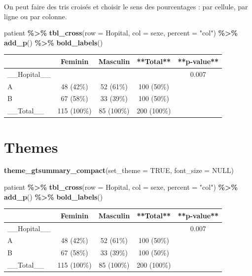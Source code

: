 \documentclass[
]{book}
\newenvironment{Shaded}{\begin{snugshade}}{\end{snugshade}}
\newcommand{\AttributeTok}[1]{\textcolor[rgb]{0.13,0.29,0.53}{#1}}
\newcommand{\ConstantTok}[1]{\textcolor[rgb]{0.56,0.35,0.01}{#1}}
\newcommand{\FunctionTok}[1]{\textcolor[rgb]{0.13,0.29,0.53}{\textbf{#1}}}
\newcommand{\NormalTok}[1]{#1}
\newcommand{\SpecialCharTok}[1]{\textcolor[rgb]{0.81,0.36,0.00}{\textbf{#1}}}
\newcommand{\StringTok}[1]{\textcolor[rgb]{0.31,0.60,0.02}{#1}}
\begin{document}
On peut faire des tris croisés et choisir le sens des pourcentages : par cellule,
par ligne ou par colonne.

\begin{Shaded}
\begin{Highlighting}[]
\NormalTok{patient }\SpecialCharTok{\%\textgreater{}\%}
  \FunctionTok{tbl\_cross}\NormalTok{(}\AttributeTok{row =}\NormalTok{ Hopital, }\AttributeTok{col =}\NormalTok{ sexe, }\AttributeTok{percent =} \StringTok{"col"}\NormalTok{) }\SpecialCharTok{\%\textgreater{}\%}
  \FunctionTok{add\_p}\NormalTok{() }\SpecialCharTok{\%\textgreater{}\%}
  \FunctionTok{bold\_labels}\NormalTok{()}
\end{Highlighting}
\end{Shaded}

\begin{tabular}{l|c|c|c|c}
\hline
 & Feminin & Masculin & **Total** & **p-value**\\
\hline
\_\_Hopital\_\_ &  &  &  & 0.007\\
\hline
A & 48 (42\%) & 52 (61\%) & 100 (50\%) & \\
\hline
B & 67 (58\%) & 33 (39\%) & 100 (50\%) & \\
\hline
\_\_Total\_\_ & 115 (100\%) & 85 (100\%) & 200 (100\%) & \\
\hline
\end{tabular}

\hypertarget{themes}{%
\section{Themes}\label{themes}}

\begin{Shaded}
\begin{Highlighting}[]
\FunctionTok{theme\_gtsummary\_compact}\NormalTok{(}\AttributeTok{set\_theme =} \ConstantTok{TRUE}\NormalTok{, }\AttributeTok{font\_size =} \ConstantTok{NULL}\NormalTok{)}

\NormalTok{patient }\SpecialCharTok{\%\textgreater{}\%}
  \FunctionTok{tbl\_cross}\NormalTok{(}\AttributeTok{row =}\NormalTok{ Hopital, }\AttributeTok{col =}\NormalTok{ sexe, }\AttributeTok{percent =} \StringTok{"col"}\NormalTok{) }\SpecialCharTok{\%\textgreater{}\%}
  \FunctionTok{add\_p}\NormalTok{() }\SpecialCharTok{\%\textgreater{}\%}
  \FunctionTok{bold\_labels}\NormalTok{()}
\end{Highlighting}
\end{Shaded}

\begin{tabular}{l|c|c|c|c}
\hline
 & Feminin & Masculin & **Total** & **p-value**\\
\hline
\_\_Hopital\_\_ &  &  &  & 0.007\\
\hline
A & 48 (42\%) & 52 (61\%) & 100 (50\%) & \\
\hline
B & 67 (58\%) & 33 (39\%) & 100 (50\%) & \\
\hline
\_\_Total\_\_ & 115 (100\%) & 85 (100\%) & 200 (100\%) & \\
\hline
\end{tabular}
\end{document}

